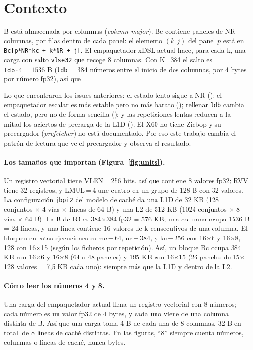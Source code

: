 \section{Contexto}
B está almacenada por columnas (\emph{column-major}). Bc contiene paneles de NR columnas, por filas dentro de cada panel: el elemento
$(k,j)$ del panel $p$ está en \texttt{Bc[p*NR*kc + k*NR + j]}. El empaquetador xDSL actual hace, para cada k, una carga con salto
\texttt{vlse32} que recoge 8 columnas. Con K=384 el salto es $\texttt{ldb}\cdot 4 = 1536$ B (\texttt{ldb} = 384 números entre el
inicio de dos columnas, por 4 bytes por número fp32), así que 

Lo que encontraron los issues anteriores: el estado lento sigue a NR (); el empaquetador escalar es más estable pero no más
barato (); rellenar \texttt{ldb} cambia el estado, pero no de forma sencilla (); y las repeticiones lentas reducen
a la mitad los aciertos de precarga de la L1D (). El X60 no tiene Zicbop y su precargador (\emph{prefetcher}) no está
documentado. Por eso este trabajo cambia el patrón de lectura que ve el precargador y observa el resultado.

\paragraph{Los tamaños que importan (Figura~\ref{fig:units}).} Un registro vectorial tiene VLEN\,=\,256 bits, así que contiene 8
valores fp32; RVV tiene 32 registros, y LMUL\,=\,4 une cuatro en un grupo de 128 B con 32 valores. La configuración \texttt{jbpi2} del
modelo de caché da una L1D de 32 KB (128 conjuntos $\times$ 4 vías $\times$ líneas de 64 B) y una L2 de 512 KB (1024 conjuntos
$\times$ 8 vías $\times$ 64 B). La B de B3 es 384$\times$384 fp32 = 576 KB; una columna ocupa 1536 B = 24 líneas, y una línea
contiene 16 valores de k consecutivos de una columna. El bloqueo en estas ejecuciones es mc\,=\,64, nc\,=\,384, y kc\,=\,256 con
16$\times$6 y 16$\times$8, 128 con 16$\times$15 (según los ficheros por repetición). Así, un bloque Bc ocupa 384 KB con 16$\times$6 y
16$\times$8 (64 o 48 paneles) y 195 KB con 16$\times$15 (26 paneles de 15$\times$128 valores = 7,5 KB cada uno): siempre más que la
L1D y dentro de la L2.

\paragraph{Cómo leer los números 4 y 8.} Una carga del empaquetador actual llena un registro vectorial con 8 números; cada número es
un valor fp32 de 4 bytes, y cada uno viene de una columna distinta de B. Así que una carga toma 4 B de cada una de 8 columnas, 32 B
en total, de 8 líneas de caché distintas. En las figuras, ``8'' siempre cuenta números, columnas o líneas de caché, nunca bytes.

